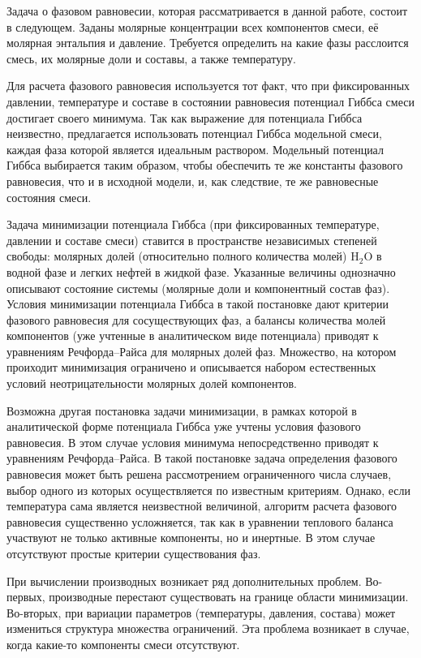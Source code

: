 \documentclass[12pt]{article}
\begin{document}
Задача о фазовом равновесии, которая рассматривается в данной работе, состоит в следующем. Заданы молярные концентрации всех компонентов смеси, её молярная энтальпия и давление. Требуется определить на какие фазы расслоится смесь, их молярные доли и составы, а также температуру.

Для расчета фазового равновесия используется тот факт, что при фиксированных давлении, температуре и составе в состоянии равновесия потенциал Гиббса смеси достигает своего минимума. Так как выражение для потенциала Гиббса неизвестно, предлагается использовать потенциал Гиббса модельной смеси, каждая фаза которой является идеальным раствором. Модельный потенциал Гиббса выбирается таким образом, чтобы обеспечить те же константы фазового равновесия, что и в исходной модели, и, как следствие, те же равновесные состояния смеси.

Задача минимизации потенциала Гиббса (при фиксированных температуре, давлении и составе смеси) ставится в пространстве независимых степеней свободы: молярных долей (относительно полного количества молей) $\mathrm{H_2O}$ в водной фазе и легких нефтей в жидкой фазе. Указанные величины  однозначно описывают состояние системы (молярные доли и компонентный состав фаз). Условия минимизации потенциала Гиббса в такой постановке дают критерии фазового равновесия для сосуществующих фаз, а балансы количества молей компонентов (уже учтенные в аналитическом виде потенциала) приводят к уравнениям Речфорда--Райса для молярных долей фаз. Множество, на котором проиходит минимизация ограничено и описывается набором естественных условий неотрицательности молярных долей компонентов.
 
Возможна другая постановка задачи минимизации, в рамках которой в аналитической форме потенциала Гиббса уже учтены условия фазового равновесия. В этом случае условия минимума непосредственно приводят к  уравнениям Речфорда--Райса. В такой постановке задача определения фазового равновесия может быть решена рассмотрением ограниченного числа случаев, выбор одного из которых осуществляется по известным критериям. Однако, если температура сама является неизвестной величиной, алгоритм расчета фазового равновесия существенно усложняется, так как в уравнении теплового баланса участвуют не только активные компоненты, но и инертные. В этом случае отсутствуют простые критерии существования фаз.

При вычислении производных возникает ряд дополнительных проблем. Во-первых, производные перестают существовать на границе области минимизации. Во-вторых, при вариации параметров (температуры, давления, состава) может измениться структура множества ограничений. Эта проблема возникает в случае, когда какие-то компоненты смеси отсутствуют.
\end{document}
